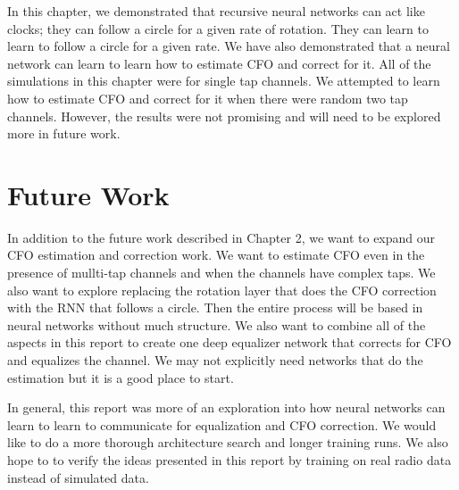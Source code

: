 In this chapter, we demonstrated that recursive neural networks can act like clocks; they can follow a circle for a given rate of rotation.  They can learn to learn to follow a circle for a given rate.
We have also demonstrated that a neural network can learn to learn how to estimate CFO and correct for it.  All of the simulations in this chapter were for single tap channels.  We attempted to learn how to estimate CFO and correct for it when there were random two tap channels.  However, the results were not promising and will need to be explored more in future work.


\section{Future Work}

In addition to the future work described in Chapter 2, we want to expand our CFO estimation and correction work.
We want to estimate CFO even in the presence of mullti-tap channels and when the channels have complex taps.
We also want to explore replacing the rotation layer that does the CFO correction with the RNN that follows a circle.  Then the entire process will be based in neural networks without much structure.
We also want to combine all of the aspects in this report to create one deep equalizer network that corrects for CFO and equalizes the channel.  We may not explicitly need networks that do the estimation but it is a good place to start.

In general, this report was more of an exploration into how neural networks can learn to learn to communicate for equalization and CFO correction.  We would like to do a more thorough architecture search and longer training runs.  We also hope to to verify the ideas presented in this report by training on real radio data instead of simulated data.